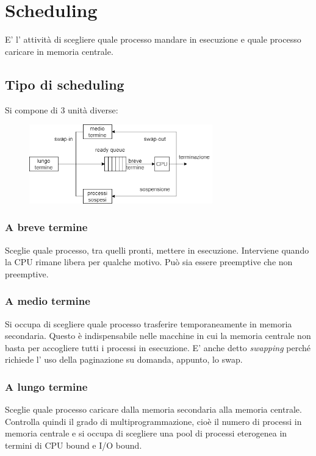 \section{Scheduling}
E' l' attività di scegliere quale processo mandare in esecuzione e quale processo caricare in memoria centrale.

\subsection{Tipo di scheduling}
Si compone di 3 unità diverse:
\begin{figure}[H]
    \centering
    \includegraphics[width=300px]{images/4_Scheduling/scheduling.png}
\end{figure}

\subsubsection{A breve termine}
Sceglie quale processo, tra quelli pronti, mettere in esecuzione.
Interviene quando la CPU rimane libera per qualche motivo.
Può sia essere preemptive che non preemptive.

\subsubsection{A medio termine}
Si occupa di scegliere quale processo trasferire temporaneamente in memoria secondaria.
Questo è indispensabile nelle macchine in cui la memoria centrale non basta per accogliere tutti i processi in esecuzione.
E' anche detto \emph{swapping} perché richiede l' uso della paginazione su domanda, appunto, lo swap.

\subsubsection{A lungo termine}
Sceglie quale processo caricare dalla memoria secondaria alla memoria centrale.
Controlla quindi il grado di multiprogrammazione, cioè il numero di processi in memoria centrale e si occupa di scegliere una pool di processi eterogenea in termini di CPU bound e I/O bound.

